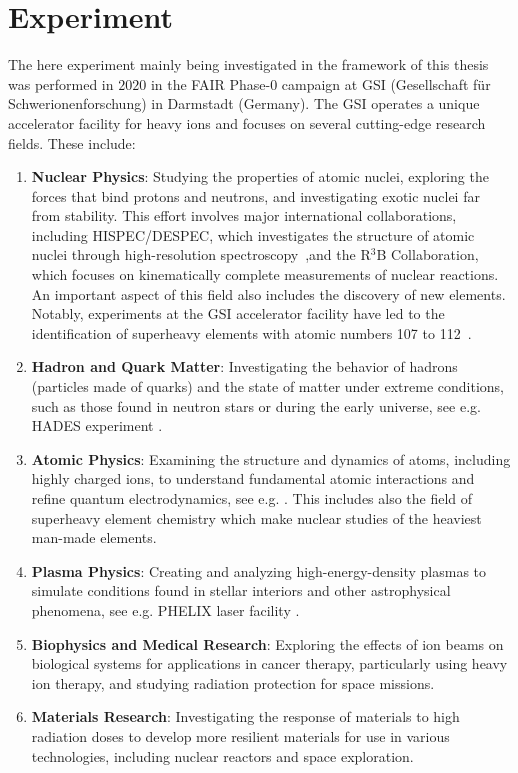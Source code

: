 \section{Experiment}
The here experiment mainly being investigated in the framework of this thesis was performed in $2020$ in the FAIR Phase-0 campaign at GSI (Gesellschaft f\"ur Schwerionenforschung) in Darmstadt (Germany). The GSI operates a unique accelerator facility for heavy ions and focuses on several cutting-edge research fields. These include:\newline
\begin{enumerate}
\item \textbf{Nuclear Physics}: Studying the properties of atomic nuclei, exploring the forces that bind protons and neutrons, and investigating exotic nuclei far from stability. This effort involves major international collaborations, including HISPEC/DESPEC, which investigates the structure of atomic nuclei through high-resolution spectroscopy~\cite{gerl2009nuclear},and the R$^3$B Collaboration, which focuses on kinematically complete measurements of nuclear reactions. An important aspect of this field also includes the discovery of new elements. Notably, experiments at the GSI accelerator facility have led to the identification of superheavy elements with atomic numbers 107 to 112~\cite{ackermann2007superheavy}.
\item \textbf{Hadron and Quark Matter}: Investigating the behavior of hadrons (particles made of quarks) and the state of matter under extreme conditions, such as those found in neutron stars or during the early universe, see e.g. HADES experiment \cite{galatyuk2014hades}.
\item \textbf{Atomic Physics}: Examining the structure and dynamics of atoms, including highly charged ions, to understand fundamental atomic interactions and refine quantum electrodynamics, see e.g. \cite{kluge2008hitrap}. This includes also the field of superheavy element chemistry which make nuclear studies of the heaviest man-made elements. 
\item \textbf{Plasma Physics}: Creating and analyzing high-energy-density plasmas to simulate conditions found in stellar interiors and other astrophysical phenomena, see e.g. PHELIX laser facility \cite{major2024high}.
\item \textbf{Biophysics and Medical Research}: Exploring the effects of ion beams on biological systems for applications in cancer therapy, particularly using heavy ion therapy, and studying radiation protection for space missions.
\item \textbf{Materials Research}: Investigating the response of materials to high radiation doses to develop more resilient materials for use in various technologies, including nuclear reactors and space exploration.
\end{enumerate}
